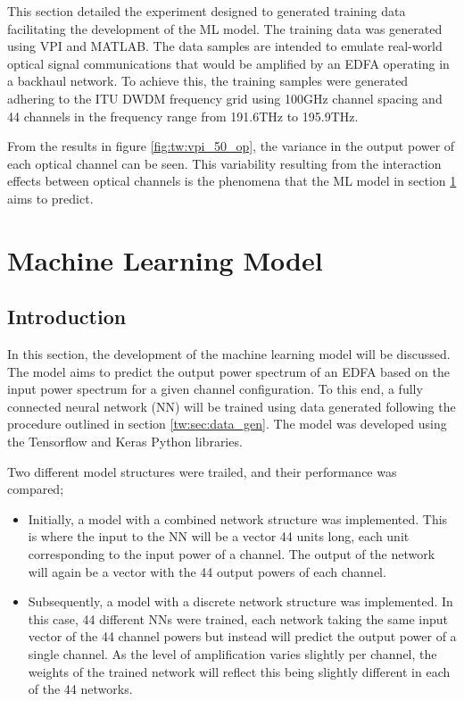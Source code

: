 This section detailed the experiment designed to generated training data facilitating the development of the ML model. The training data was generated using VPI and MATLAB. The data samples are intended to emulate real-world optical signal communications that would be amplified by an EDFA operating in a backhaul network. To achieve this, the training samples were generated adhering to the ITU DWDM frequency grid using 100GHz channel spacing and 44 channels in the frequency range from 191.6THz to 195.9THz.

From the results in figure \ref{fig:tw:vpi_50_op}, the variance in the output power of each optical channel can be seen. This variability resulting from the interaction effects between optical channels is the phenomena that the ML model in section \ref{sec:ml_model} aims to predict.  





\section{Machine Learning Model}\label{sec:ml_model}

\subsection{Introduction}
In this section, the development of the machine learning model will be discussed. The model aims to predict the output power spectrum of an EDFA based on the input power spectrum for a given channel configuration. To this end, a fully connected neural network (NN) will be trained using data generated following the procedure outlined in section \ref{tw:sec:data_gen}. The model was developed using the Tensorflow and Keras Python libraries.

Two different model structures were trailed, and their performance was compared; 
\begin{itemize}
    \item Initially, a model with a combined network structure was implemented. This is where the input to the NN will be a vector 44 units long, each unit corresponding to the input power of a channel. The output of the network will again be a vector with the 44 output powers of each channel.

    \item Subsequently, a model with a discrete network structure was implemented. In this case, 44 different NNs were trained, each network taking the same input vector of the 44 channel powers but instead will predict the output power of a single channel. As the level of amplification varies slightly per channel, the weights of the trained network will reflect this being slightly different in each of the 44 networks.
\end{itemize}    

